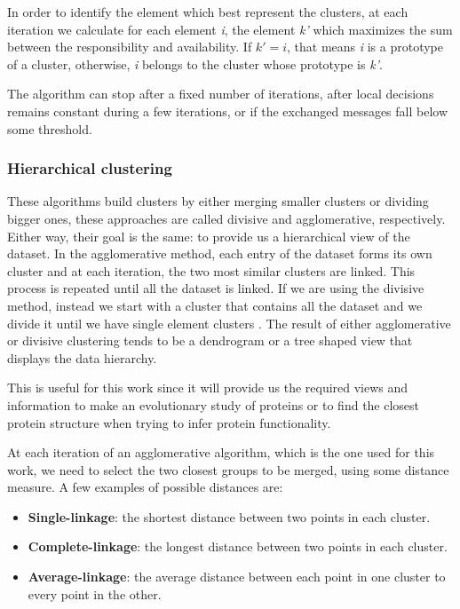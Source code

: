 In order to identify the element which best represent the clusters, at each iteration we calculate for each element \textit{i}, the element \textit{k'} which maximizes the sum between the responsibility and availability. If $k' = i$, that means \textit{i} is a prototype of a cluster, otherwise, \textit{i} belongs to the cluster whose prototype is \textit{k'}.

The algorithm can stop after a fixed number of iterations, after local decisions remains constant during a few iterations, or if the exchanged messages fall below some threshold.

\medskip
\subsubsection{Hierarchical clustering}

These algorithms build clusters by either merging smaller clusters or dividing bigger ones, these approaches are called divisive and agglomerative, respectively. Either way, their goal is the same: to provide us a hierarchical view of the dataset. In the agglomerative method, each entry of the dataset forms its own cluster and at each iteration, the two most similar clusters are linked. This process is repeated until all the dataset is linked. If we are using the divisive method, instead we start with a cluster that contains all the dataset and we divide it until we have single element clusters \cite{jain1999data}. The result of either agglomerative or divisive clustering tends to be a dendrogram or a tree shaped view that displays the data hierarchy. 

This is useful for this work since it will provide us the required views and information to make an evolutionary study of proteins or to find the closest protein structure when trying to infer protein functionality.

At each iteration of an agglomerative algorithm, which is the one used for this work, we need to select the two closest groups to be merged, using some distance measure. A few examples of possible distances are:

\begin{itemize}
	\item \textbf{Single-linkage}: the shortest distance between two points in each cluster.
	\item \textbf{Complete-linkage}: the longest distance between two points in each cluster.
	\item \textbf{Average-linkage}: the average distance between each point in one cluster to every point in the other.
\end{itemize}

